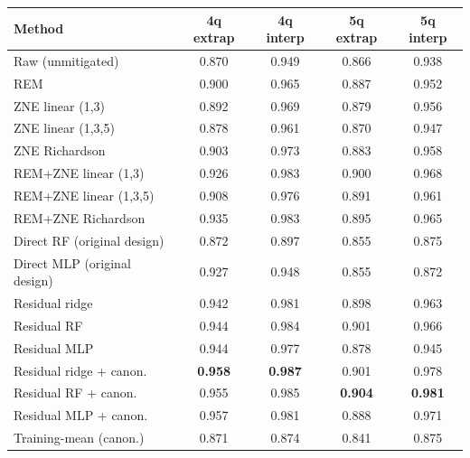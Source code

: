 \begin{tabular}{lcccc}
\toprule
Method & 4q extrap & 4q interp & 5q extrap & 5q interp \\
\midrule
Raw (unmitigated) & 0.870 & 0.949 & 0.866 & 0.938 \\
REM & 0.900 & 0.965 & 0.887 & 0.952 \\
ZNE linear (1,3) & 0.892 & 0.969 & 0.879 & 0.956 \\
ZNE linear (1,3,5) & 0.878 & 0.961 & 0.870 & 0.947 \\
ZNE Richardson & 0.903 & 0.973 & 0.883 & 0.958 \\
REM+ZNE linear (1,3) & 0.926 & 0.983 & 0.900 & 0.968 \\
REM+ZNE linear (1,3,5) & 0.908 & 0.976 & 0.891 & 0.961 \\
REM+ZNE Richardson & 0.935 & 0.983 & 0.895 & 0.965 \\
\midrule

Direct RF (original design) & 0.872 & 0.897 & 0.855 & 0.875 \\
Direct MLP (original design) & 0.927 & 0.948 & 0.855 & 0.872 \\
Residual ridge & 0.942 & 0.981 & 0.898 & 0.963 \\
Residual RF & 0.944 & 0.984 & 0.901 & 0.966 \\
Residual MLP & 0.944 & 0.977 & 0.878 & 0.945 \\
Residual ridge + canon. & \textbf{0.958} & \textbf{0.987} & 0.901 & 0.978 \\
Residual RF + canon. & 0.955 & 0.985 & \textbf{0.904} & \textbf{0.981} \\
Residual MLP + canon. & 0.957 & 0.981 & 0.888 & 0.971 \\
Training-mean (canon.) & 0.871 & 0.874 & 0.841 & 0.875 \\
\midrule

\bottomrule
\end{tabular}